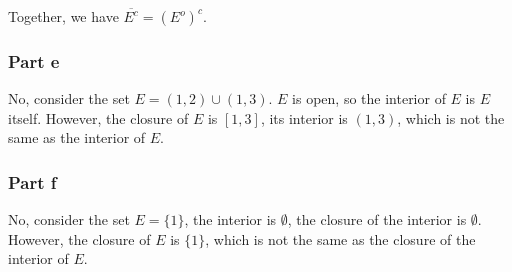 Together, we have $ \overline{E^c} = (E^o)^c $.

\subsubsection*{Part e}
No, consider the set $ E = (1, 2) \cup (1, 3) $. $ E $ is open, so the interior of $ E $ is $ E $ itself. However, the closure of $ E $ is $ [1, 3] $, its interior is $ (1, 3) $, which is not the same as the interior of $ E $.

\subsubsection*{Part f}
No, consider the set $ E = \{1\} $, the interior is $ \emptyset $, the closure of the interior is $ \emptyset $. However, the closure of $ E $ is $ \{1\} $, which is not the same as the closure of the interior of $ E $.